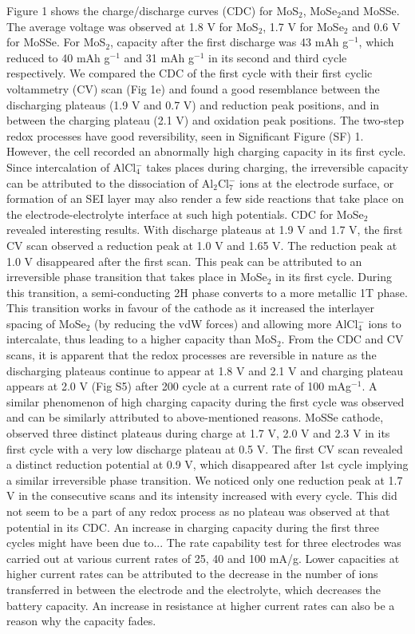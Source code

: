 \documentclass[num-refs]{wiley-article}
\begin{document}
Figure 1 shows the charge/discharge curves (CDC) for MoS$_2$, MoSe$_2$and MoSSe. The average voltage was observed at 1.8 V for MoS$_2$, 1.7 V for MoSe$_2$ and 0.6 V for MoSSe. For MoS$_2$, capacity after the first discharge was 43 mAh g$^{-1}$, which reduced to 40 mAh g$^{-1}$ and 31 mAh g$^{-1}$ in its second and third cycle respectively. We compared the CDC of the first cycle with their first cyclic voltammetry (CV) scan (Fig 1e) and found a good resemblance between the discharging plateaus (1.9 V and 0.7 V) and reduction peak positions, and in between the charging plateau (2.1 V) and oxidation peak positions. The two-step redox processes have good reversibility, seen in Significant Figure (SF) 1. However, the cell recorded an abnormally high charging capacity in its first cycle. Since intercalation of AlCl$_4^-$ takes places during charging, the irreversible capacity can be attributed to the dissociation of Al$_2$Cl$_7^-$ ions at the electrode surface, or formation of an SEI layer may also render a few side reactions that take place on the electrode-electrolyte interface at such high potentials. CDC for MoSe$_2$ revealed interesting results. With discharge plateaus at 1.9 V and 1.7 V, the first CV scan observed a reduction peak at 1.0 V and 1.65 V. The reduction peak at 1.0 V disappeared after the first scan. This peak can be attributed to an irreversible phase transition that takes place in MoSe$_2$ in its first cycle. During this transition, a semi-conducting 2H phase converts to a more metallic 1T phase.  This transition works in favour of the cathode as it increased the interlayer spacing of MoSe$_2$ (by reducing the vdW forces) and allowing more AlCl$_4^-$ ions to intercalate, thus leading to a higher capacity than MoS$_2$. From the CDC and CV scans, it is apparent that the redox processes are reversible in nature as the discharging plateaus continue to appear at 1.8 V and 2.1 V and charging plateau appears at 2.0 V (Fig S5) after 200 cycle at a current rate of 100 mAg$^{-1}$. A similar phenomenon of high charging capacity during the first cycle was observed and can be similarly attributed to above-mentioned reasons. MoSSe cathode, observed three distinct plateaus during charge at 1.7 V, 2.0 V and 2.3 V in its first cycle with a very low discharge plateau at 0.5 V. The first CV scan revealed a distinct reduction potential at 0.9 V, which disappeared after 1st cycle implying a similar irreversible phase transition. We noticed only one reduction peak at 1.7 V in the consecutive scans and its intensity increased with every cycle. This did not seem to be a part of any redox process as no plateau was observed at that potential in its CDC. An increase in charging capacity during the first three cycles might have been due to... The rate capability test for three electrodes was carried out at various current rates of 25, 40 and 100 mA/g. Lower capacities at higher current rates can be attributed to the decrease in the number of ions transferred in between the electrode and the electrolyte, which decreases the battery capacity. An increase in resistance at higher current rates can also be a reason why the capacity fades.
\end{document}
